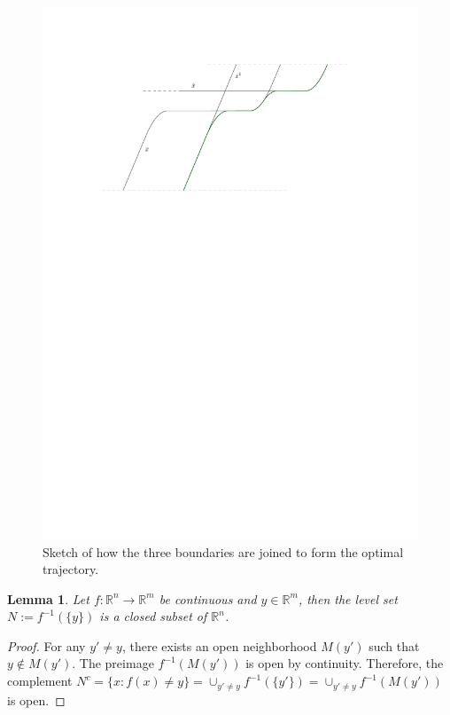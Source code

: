 \documentclass[a4paper]{article}
\theoremstyle{definition}
\theoremstyle{plain}
\newtheorem{lemma}{Lemma\hspace{0.25em}\ignorespaces}
\begin{document}
\begin{figure}
  \centering
  \includegraphics[scale=1]{figures/motion/rough/proof}
  \caption{Sketch of how the three boundaries are joined to form the
    optimal trajectory.}%
  \label{fig:proof}
\end{figure}



\begin{lemma}\label{lemma:levelset}
  Let $f :\mathbb{R}^{n} \rightarrow \mathbb{R}^{m}$ be continuous and
  $y \in \mathbb{R}^{m}$, then the level set $N := f^{-1}(\{ y \})$ is a closed
  subset of $\mathbb{R}^{n}$.
\end{lemma}
\begin{proof}
  For any $y' \neq y$, there exists an open neighborhood $M(y')$ such that
  $y \notin M(y')$. The preimage $f^{-1}(M(y'))$ is open by continuity.
  Therefore, the complement
  $N^{c} = \{ x : f(x) \neq y \} = \cup_{y' \neq y} f^{-1}(\{y'\}) = \cup_{y' \neq y} f^{-1}(M(y'))$
  is open.
\end{proof}
\end{document}
